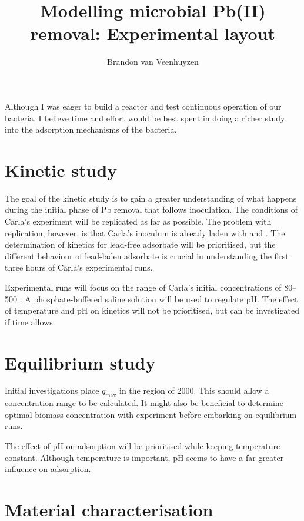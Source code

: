 \documentclass[hidelinks,12pt,a4paper]{article}
\title{Modelling microbial Pb(II) removal: Experimental layout}
\author{Brandon van Veenhuyzen}
\begin{document}
	
	\maketitle
	
	\noindent Although I was eager to build a reactor and test continuous operation of our bacteria, I believe time and effort would be best spent in doing a richer study into the adsorption mechanisms of the bacteria.
	
	\section{Kinetic study}
	
	The goal of the kinetic study is to gain a greater understanding of what happens during the initial phase of Pb removal that follows inoculation. The conditions of Carla's experiment will be replicated as far as possible. The problem with replication, however, is that Carla's inoculum is already laden with  and . The determination of  kinetics for lead-free adsorbate will be prioritised, but the different behaviour of lead-laden adsorbate is crucial in understanding the first three hours of Carla's experimental runs.
	
	Experimental runs will focus on the range of Carla's initial concentrations of \SIrange{80}{500}{\mgpl} . A phosphate-buffered saline solution will be used to regulate pH. The effect of temperature and pH on kinetics will not be prioritised, but can be investigated if time allows.
	
	\section{Equilibrium study}
	
	Initial investigations place $q_\mathrm{max}$ in the region of \SI{2000}{\mgg}. This should allow a concentration range to be calculated. It might also be beneficial to determine optimal biomass concentration with experiment before embarking on equilibrium runs.
	
	The effect of pH on adsorption will be prioritised while keeping temperature constant. Although temperature is important, pH seems to have a far greater influence on adsorption. 
	
	\section{Material characterisation}
	
\end{document}
